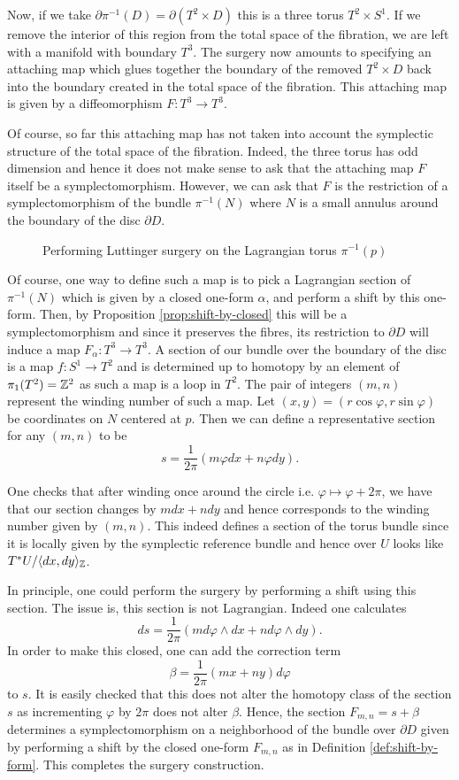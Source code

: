 Now, if we take $\partial \pi^{-1}(D) = \partial (T^2 \times D)$ this is a
three torus $T^2 \times S^1$. If we remove the interior of this region from the
total space of the fibration, we are left with a manifold with boundary $T^3$.
The surgery now amounts to specifying an attaching map which glues together the
boundary of the removed $T^2 \times D$ back into the boundary created in the
total space of the fibration. This attaching map is given by a diffeomorphism
$F: T^3 \to T^3$.

Of course, so far this attaching map has not taken into account the symplectic
structure of the total space of the fibration. Indeed, the three torus has odd
dimension and hence it does not make sense to ask that the attaching map $F$
itself be a symplectomorphism. However, we can ask that $F$ is the restriction
of a symplectomorphism of the bundle $\pi^{-1}(N)$ where $N$ is a small annulus
around the boundary of the disc $\partial D$.

\begin{figure}[H]
    \centering
    \caption{Performing Luttinger surgery on the Lagrangian torus $\pi^{-1}(p)$}
\end{figure}

Of course, one way to define such a map is to pick a Lagrangian section of
$\pi^{-1}(N)$ which is given by a closed one-form $\alpha$, and perform a shift
by this one-form. Then, by Proposition \ref{prop:shift-by-closed} this will be
a symplectomorphism and since it preserves the fibres, its restriction to
$\partial D$ will induce a map $F_{\alpha}: T^3 \to T^3$. A section of our
bundle over the boundary of the disc is a map $f: S^1 \to T^2$ and is
determined up to homotopy by an element of $\pi_1(T^2) = \mathbb{Z}^2$ as such a map is
a loop in $T^2$. The pair of integers $(m,n)$ represent the winding number of
such a map. Let $(x,y) = (r\cos \varphi, r \sin \varphi)$ be coordinates on $N$
centered at $p$. Then we can define a representative section for any $(m,n)$ to
be $$ s = \frac{1}{2\pi} (m\varphi dx + n \varphi dy).$$

One checks that after winding once around the circle i.e. $\varphi \mapsto
    \varphi + 2 \pi$, we have that our section changes by $mdx + ndy$ and hence
corresponds to the winding number given by $(m,n)$. This indeed defines a
section of the torus bundle since it is locally given by the symplectic
reference bundle and hence over $U$ looks like $T^*U/\langle dx, dy
    \rangle_{\mathbb{Z}}$.

In principle, one could perform the surgery by performing a shift using this
section. The issue is, this section is not Lagrangian. Indeed one calculates $$
    ds = \frac{1}{2 \pi}(m d \varphi \wedge dx + n d \varphi \wedge dy). $$ In
order to make this closed, one can add the correction term $$ \beta =
    \frac{1}{2\pi}(mx+ny)d\varphi $$ to $s$. It is easily checked that this does
not alter the homotopy class of the section $s$ as incrementing $\varphi$ by
$2\pi$ does not alter $\beta$. Hence, the section $F_{m,n} = s + \beta$
determines a symplectomorphism on a neighborhood of the bundle over $\partial
    D$ given by performing a shift by the closed one-form $F_{m,n}$ as in
Definition \ref{def:shift-by-form}. This completes the surgery construction.

